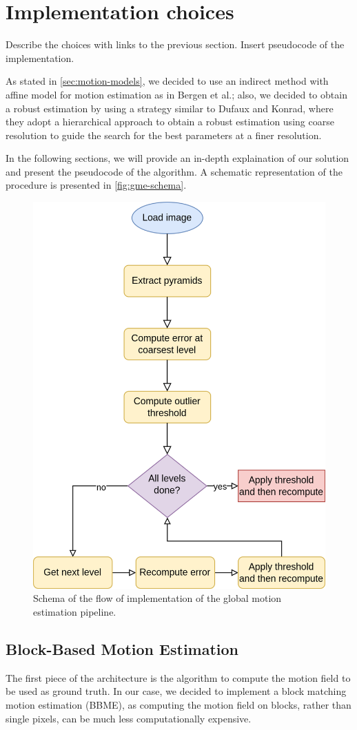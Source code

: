\section{Implementation choices}
\label{sec:03-implementation}
Describe the choices with links to the previous section.
Insert pseudocode of the implementation.

As stated in \cref{sec:motion-models}, we decided to use an indirect method with affine model for motion estimation as in Bergen et al.\cite{Bergen92}; also, we decided to obtain a robust estimation by using a strategy similar to Dufaux and Konrad\cite{Dufeaux2000}, where they adopt a hierarchical approach to obtain a robust estimation using coarse resolution to guide the search for the best parameters at a finer resolution.

In the following sections, we will provide an in-depth explaination of our solution and present the pseudocode of the algorithm. A schematic representation of the procedure is presented in \cref{fig:gme-schema}.

\begin{figure}
    \centering
    \includegraphics[width=.7\linewidth]{../assets/images/implementation-flow.png}
    \caption{Schema of the flow of implementation of the global motion estimation pipeline.}
    \label{fig:implementation-flow}
\end{figure}

\subsection{Block-Based Motion Estimation}
\label{sec:BBME}
The first piece of the architecture is the algorithm to compute the motion field to be used as ground truth.
In our case, we decided to implement a block matching motion estimation (BBME), as computing the motion field on blocks, rather than single pixels, can be much less computationally expensive.

